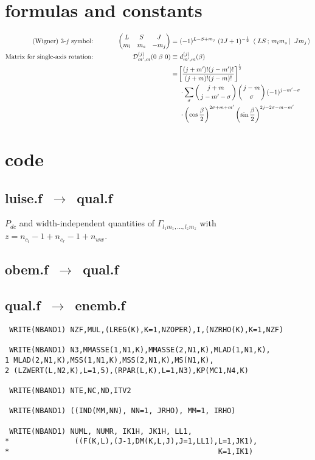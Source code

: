 \documentclass[onecolumn,preprint,superscriptaddress,nofootinbib,notitlepage,10pt,linenumbers]{revtex4-1}
\newcommand{\threej}[6]{\ensuremath{\begin{pmatrix}#1 & #2 & #3\\#4&#5&#6 \end{pmatrix}}}
\newcommand{\clg}[6]{\ensuremath{\left\langle\left.\,#1#2\,;\,#3#4\,\right\vert\right.\left.\,#5#6\,\right\rangle}}
\begin{document}
\newpage

\section{formulas and constants}

\begin{alignat}{2}
\text{(Wigner) 3-$j$ symbol:} &\hspace{1cm}& \threej{L}{S}{J}{m_l}{m_s}{-m_j}=&~(-1)^{L-S+m_j}~(2J+1)^{-\frac{1}{2}}~\clg{L}{S}{m_l}{m_s}{J}{m_j}\\
\text{Matrix for single-axis rotation:} &\hspace{1cm}&   \mathcal{D}_{m^\prime,m}^{(j)}(0~\beta~0)\equiv&~d_{m^\prime,m}^{(j)}(\beta)\nonumber\\
&\hspace{1cm}& =&\left[\frac{(j+m^\prime)!(j-m^\prime)!}{(j+m)!(j-m)!}\right]^\frac{1}{2}\nonumber\\
&\hspace{1cm}&&~\cdot\sum_\sigma\left(j+m\atop j-m^\prime-\sigma\right)\left(j-m\atop \sigma\right)(-1)^{j-m^\prime-\sigma}\nonumber\\
&\hspace{1cm}&&~\cdot\left(\cos\frac{\beta}{2}\right)^{2\sigma+m+m^\prime}\left(\sin\frac{\beta}{2}\right)^{2j-2\sigma-m-m^\prime}
\end{alignat}

\section{code}

\subsection*{luise.f~$\to$~qual.f}
$P_{dc}$ and width-independent quantities of $\Gamma_{l_1m_1,\ldots,l_zm_z}$ with $z=n_{c_l}-1+n_{c_r}-1+n_{ww}$.

\subsection*{obem.f~$\to$~qual.f}


\subsection*{qual.f~$\to$~enemb.f}

\begin{lstlisting}
 WRITE(NBAND1) NZF,MUL,(LREG(K),K=1,NZOPER),I,(NZRHO(K),K=1,NZF)

 WRITE(NBAND1) N3,MMASSE(1,N1,K),MMASSE(2,N1,K),MLAD(1,N1,K),
1 MLAD(2,N1,K),MSS(1,N1,K),MSS(2,N1,K),MS(N1,K),
2 (LZWERT(L,N2,K),L=1,5),(RPAR(L,K),L=1,N3),KP(MC1,N4,K)

 WRITE(NBAND1) NTE,NC,ND,ITV2

 WRITE(NBAND1) ((IND(MM,NN), NN=1, JRHO), MM=1, IRHO)

 WRITE(NBAND1) NUML, NUMR, IK1H, JK1H, LL1,
*               ((F(K,L),(J-1,DM(K,L,J),J=1,LL1),L=1,JK1),
*                                                K=1,IK1)
\end{lstlisting}
\end{document}
